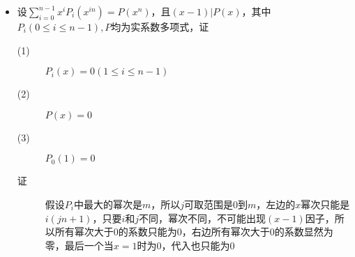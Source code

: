 \begin{itemize}
\item 设$\sum_{i=0}^{n-1}x^iP_i(x^{in})=P(x^n)$，且$(x-1)|P(x)$，其中$P_i(0\leq i\leq n-1),P$均为实系数多项式，证
\begin{description}
\item[(1)] $P_i(x)=0(1\leq i\leq n-1)$
\item[(2)] $P(x)=0$
\item[(3)] $P_0(1)=0$
\item[证] 假设$P_i$中最大的幂次是$m$，所以$j$可取范围是0到$m$，左边的$x$幂次只能是$i(jn+1)$，只要$i$和$j$不同，幂次不同，不可能出现$(x-1)$因子，所以所有幂次大于0的系数只能为0，右边所有幂次大于0的系数显然为零，最后一个当$x=1$时为0，代入也只能为0
\end{description}

































\end{itemize}

